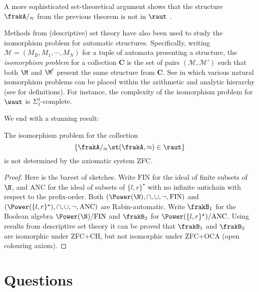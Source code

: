 A more sophisticated set-theoretical argument shows that the structure $\frakA/_{\approx}$ from the previous theorem is not in $\raut$ \cite{HKMN08}.

Methods from (descriptive) set theory have also been used to study the isomorphism problem for automatic structures.
Specifically, writing $\mathcal{M} = (M_B,M_1,\cdots,M_N)$ for a tuple of automata presenting a structure, the {\em isomorphism problem} for a collection
$\mathbf{C}$ is the set of pairs $(\mathcal{M},\mathcal{M'})$ such that both $\M$ and $\M'$ present the same structure from $\mathbf{C}$. See \cite{Rubi04,KLL10CSL,KLL10LICS} in which various natural isomorphism problems can be placed within the arithmetic and analytic hierarchy (see \cite{Roge67} for definitions). For instance, the complexity of the
isomorphism problem for $\waut$ is $\Sigma^1_1$-complete.

We end with a stunning result:

\begin{theorem}
The isomorphism problem for the collection 
\[
\{\frakA/_\approx \st (\frakA,\approx) \in \raut\}
\]
is not determined by the axiomatic system \textrm{ZFC}.
\end{theorem}

\begin{proof}
Here is the barest of sketches. 
Write $\mathrm{FIN}$ for the ideal of finite subsets of $\N$, and $\mathrm{ANC}$ for the ideal of subsets of $\{l,r\}^\star$ with no infinite antichain with respect to the prefix-order.
Both $(\Power(\N),\cap,\cup,\neg,\mathrm{FIN})$ and $(\Power(\{l,r\}^\star),\cap,\cup,\neg,\mathrm{ANC})$ are Rabin-automatic. Write $\frakB_1$ for the Boolean algebra $\Power(\N)/\mathrm{FIN}$ and $\frakB_2$ for $\Power(\{l,r\}^\star)/\mathrm{ANC}$.
Using results from descriptive set theory it can be proved  that $\frakB_1$ and $\frakB_2$  are isomorphic under ZFC+CH, but  not isomorphic under ZFC+OCA (open colouring axiom).
\end{proof}


\section{Questions} \label{AS:sec:summary}

